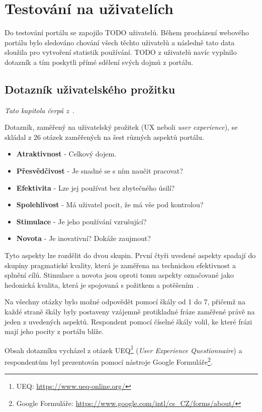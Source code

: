 \section{Testování na uživatelích}
Do testování portálu se zapojilo TODO uživatelů. Během procházení webového portálu bylo sledováno chování všech těchto uživatelů a následně tato data sloužila pro vytvoření statistik používání. TODO z uživatelů navíc vyplnilo dotazník a tím poskytli přímé sdělení svých dojmů z portálu. 

\subsection{Dotazník uživatelského prožitku}
\emph{Tato kapitola čerpá z~\cite{bib:ueq}}.

Dotazník, zaměřený na uživatelský prožitek (UX neboli \emph{user experience}), se skládal z 26 otázek zaměřených na šest různých aspektů portálu.
\begin{itemize}
    \item \textbf{Atraktivnost} - Celkový dojem.
    \item \textbf{Přesvědčivost} - Je snadné se s ním naučit pracovat?
    \item \textbf{Efektivita} - Lze jej používat bez zbytečného úsilí?
    \item \textbf{Spolehlivost} - Má uživatel pocit, že má vše pod kontrolou?
    \item \textbf{Stimulace} - Je jeho používání vzrušující?
    \item \textbf{Novota} - Je inovativní? Dokáže zaujmout?
\end{itemize}
Tyto aspekty lze rozdělit do dvou skupin. První čtyři uvedené aspekty spadají do skupiny pragmatické kvality, která je zaměřena na technickou efektivnost a splnění cílů. Stimulace a novota jsou oproti tomu aspekty označované jako hedonická kvalita, která je spojovaná s požitkem a potěšením~\cite{bib:hedonic}.

Na všechny otázky bylo možné odpovědět pomocí škály od 1 do 7, přičemž na každé straně škály byly postaveny vzájemně protikladné fráze zaměřené právě na jeden z uvedených aspektů. Respondent pomocí číselné škály volil, ke které frázi mají jeho pocity z portálu blíže.

Obsah dotazníku vycházel z otázek UEQ\footnote{UEQ: \url{https://www.ueq-online.org/}} (\emph{User Experience Questionnaire}) a respondentům byl prezentován pomocí nástroje Google Formuláře\footnote{Google Formuláře: \url{https://www.google.com/intl/cs_CZ/forms/about/}}.

